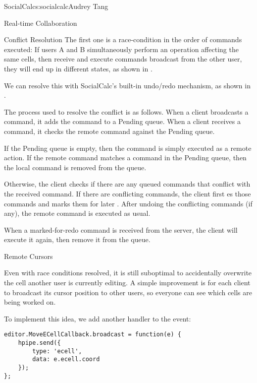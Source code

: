 \begin{aosachapter}{SocialCalc}{s:socialcalc}{Audrey Tang}
\begin{aosasect1}{Real-time Collaboration}
\begin{aosasect2}{Conflict Resolution}
The first one is a race-condition in the order of commands executed:
If users A and B simultaneously perform an operation affecting the
same cells, then receive and execute commands broadcast from the other
user, they will end up in different states, as shown in
.


We can resolve this with SocialCalc's built-in undo/redo mechanism, as
shown in .


The process used to resolve the conflict is as follows.  When a client
broadcasts a command, it adds the command to a Pending queue.  When a client
receives a command, it checks the remote command against the Pending queue.

If the Pending queue is empty, then the command is simply executed as a remote
action. If the remote command matches a command in the Pending queue, then the
local command is removed from the queue.

Otherwise, the client checks if there are any queued commands that conflict
with the received command.  If there are conflicting commands, the client first
es those commands and marks them for later .  After
undoing the conflicting commands (if any), the remote command is executed as
usual.

When a marked-for-redo command is received from the server, the client will
execute it again, then remove it from the queue.


\end{aosasect2}

\begin{aosasect2}{Remote Cursors}

Even with race conditions resolved, it is still suboptimal to
accidentally overwrite the cell another user is currently editing.  A
simple improvement is for each client to broadcast its cursor position
to other users, so everyone can see which cells are being worked on.

To implement this idea, we add another  handler to the
 event:

\begin{verbatim}
editor.MoveECellCallback.broadcast = function(e) {
    hpipe.send({
        type: 'ecell',
        data: e.ecell.coord
    });
};


\end{verbatim}
\end{aosasect2}
\end{aosasect1}
\end{aosachapter}
